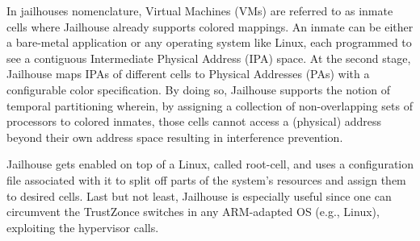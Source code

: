 In jailhouses 
nomenclature, Virtual Machines (VMs) are referred to as inmate cells where Jailhouse already supports colored mappings. An inmate can be either a bare-metal application or any operating system like Linux, each programmed to see a contiguous Intermediate Physical Address (IPA) space. At the second stage, Jailhouse maps IPAs of different cells to Physical Addresses (PAs) with a configurable color specification. By doing so, Jailhouse supports the notion of temporal partitioning wherein, by assigning a collection of non-overlapping sets of processors to colored inmates, those cells cannot access a (physical) address beyond their own address space resulting in interference prevention.

Jailhouse gets enabled on top of a Linux, called root-cell, and uses a configuration file associated with it to split off parts of the system's resources and assign them to desired cells. Last but not least, Jailhouse is especially useful since one can circumvent the TrustZonce switches in any ARM-adapted OS (e.g., Linux), exploiting the hypervisor calls.

